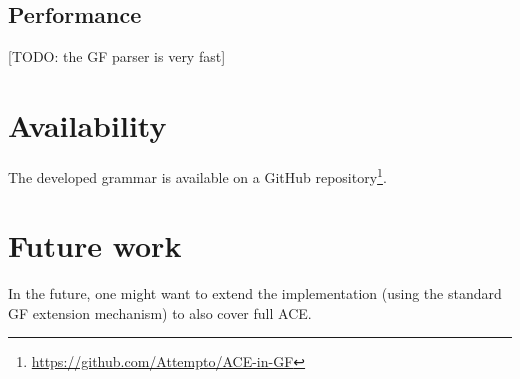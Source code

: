 \documentclass[a4paper]{article}
\begin{document}
\subsection{Performance}

[TODO: the GF parser is very fast]

\section{Availability}

The developed grammar is available on a GitHub
repository\footnote{\url{https://github.com/Attempto/ACE-in-GF}}.

\section{Future work}

In the
future, one might want to extend the implementation (using
the standard GF extension mechanism) to also cover full ACE.



%
\end{document}

